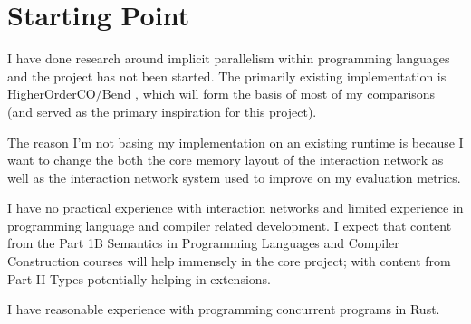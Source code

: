 \documentclass{article}
\begin{document}
\section{Starting Point}

I have done research around implicit parallelism within programming languages and the project has not been started. The primarily existing implementation is HigherOrderCO/Bend \cite{bend}, which will form the basis of most of my comparisons (and served as the primary inspiration for this project).

The reason I'm not basing my implementation on an existing runtime is because I want to change the both the core memory layout of the interaction network as well as the interaction network system used to improve on my evaluation metrics.

I have no practical experience with interaction networks and limited experience in programming language and compiler related development. I expect that content from the Part 1B Semantics in Programming Languages and Compiler Construction courses will help immensely in the core project; with content from Part II Types potentially helping in extensions.
 
I have reasonable experience with programming concurrent programs in Rust.
\end{document}
